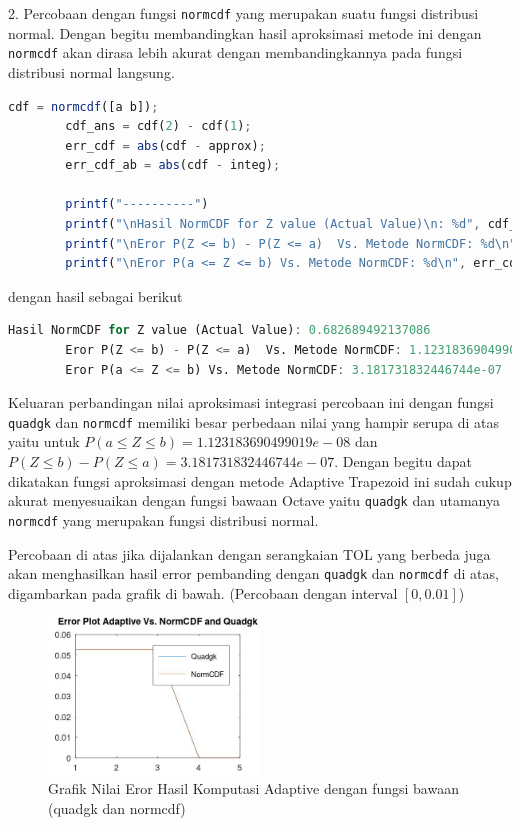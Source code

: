 \documentclass[journal,12pt,onecolumn,a4paper]{IEEEtran}
\begin{document}
2. Percobaan dengan fungsi \lstinline{normcdf} yang merupakan suatu fungsi distribusi normal. Dengan begitu membandingkan hasil aproksimasi metode ini dengan \lstinline{normcdf} akan dirasa lebih akurat dengan membandingkannya pada fungsi distribusi normal langsung.

\begin{center}
	\begin{lstlisting}[language=Octave]
		cdf = normcdf([a b]);
		cdf_ans = cdf(2) - cdf(1);
		err_cdf = abs(cdf - approx);
		err_cdf_ab = abs(cdf - integ);

		printf("----------")
		printf("\nHasil NormCDF for Z value (Actual Value)\n: %d", cdf_ans)
		printf("\nEror P(Z <= b) - P(Z <= a)  Vs. Metode NormCDF: %d\n", err_cdf)
		printf("\nEror P(a <= Z <= b) Vs. Metode NormCDF: %d\n", err_cdf_ab)
	\end{lstlisting}
\end{center}

dengan hasil sebagai berikut

\begin{center}
	\begin{lstlisting}[language=Octave]
		Hasil NormCDF for Z value (Actual Value): 0.682689492137086
		Eror P(Z <= b) - P(Z <= a)  Vs. Metode NormCDF: 1.123183690499019e-08
		Eror P(a <= Z <= b) Vs. Metode NormCDF: 3.181731832446744e-07
	\end{lstlisting}
\end{center}

Keluaran perbandingan nilai aproksimasi integrasi percobaan ini dengan fungsi \lstinline{quadgk} dan \lstinline{normcdf} memiliki besar perbedaan nilai
yang hampir serupa di atas yaitu untuk \(P(a \le Z \le b)= 1.123183690499019e-08\)  dan \(P(Z \le b ) - P(Z \le a ) = 3.181731832446744e-07\).
Dengan begitu dapat dikatakan fungsi aproksimasi dengan metode
Adaptive Trapezoid ini sudah cukup akurat menyesuaikan dengan fungsi bawaan Octave yaitu \lstinline{quadgk} dan utamanya \lstinline{normcdf} yang merupakan fungsi distribusi normal.

Percobaan di atas jika dijalankan dengan serangkaian TOL yang berbeda juga akan menghasilkan hasil error pembanding dengan \lstinline{quadgk} dan \lstinline{normcdf} di atas, digambarkan pada grafik di bawah.
(Percobaan dengan interval \([0,0.01]\))
\begin{figure}[h]
	\centering
	\includegraphics[width=0.5\textwidth]{trapezoid graf.jpg}
	\caption{Grafik Nilai Eror Hasil Komputasi Adaptive dengan fungsi bawaan (quadgk dan normcdf)}
	\label{fig:difGraphAdaptive}
\end{figure}
\end{document}
